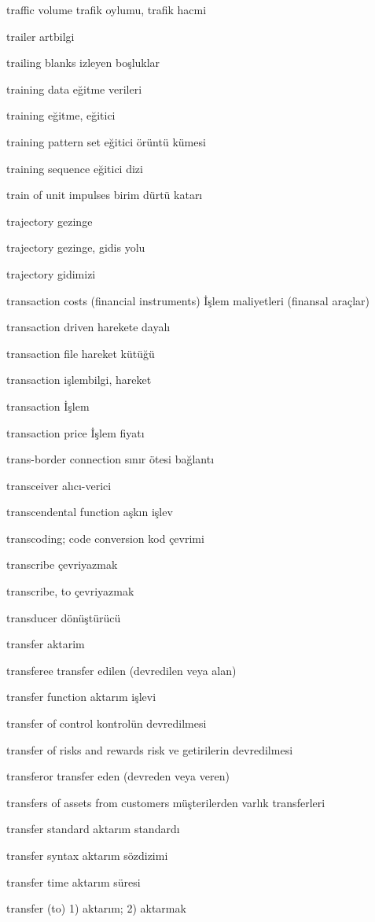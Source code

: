 \documentclass[12pt,fleqn]{article}\usepackage{../../common}
\begin{document}
traffic volume trafik oylumu, trafik hacmi

trailer artbilgi

trailing blanks izleyen boşluklar

training data eğitme verileri

training eğitme, eğitici

training pattern set eğitici örüntü kümesi

training sequence eğitici dizi

train of unit impulses birim dürtü katarı

trajectory gezinge

trajectory gezinge, gidis yolu

trajectory gidimizi

transaction costs (financial instruments) İşlem maliyetleri (finansal araçlar)

transaction driven harekete dayalı

transaction file hareket kütüğü

transaction işlembilgi, hareket

transaction İşlem

transaction price İşlem fiyatı

trans-border connection sınır ötesi bağlantı

transceiver alıcı-verici

transcendental function aşkın işlev

transcoding; code conversion kod çevrimi

transcribe çevriyazmak

transcribe, to çevriyazmak

transducer dönüştürücü

transfer aktarim

transferee transfer edilen (devredilen veya alan)

transfer function aktarım işlevi

transfer of control kontrolün devredilmesi

transfer of risks and rewards risk ve getirilerin devredilmesi

transferor transfer eden (devreden veya veren)

transfers of assets from customers müşterilerden varlık transferleri

transfer standard aktarım standardı

transfer syntax aktarım sözdizimi

transfer time aktarım süresi

transfer (to) 1) aktarım; 2) aktarmak
\end{document}
